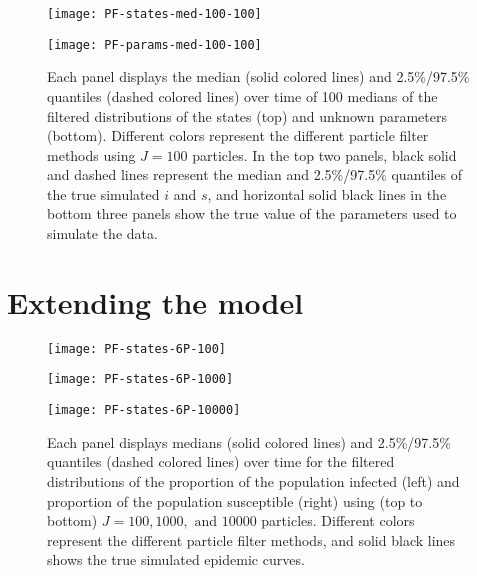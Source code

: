 \documentclass{article}
\begin{document}
\begin{figure}[ht]
\centering
\begin{minipage}{1.0\linewidth}
\texttt{[image: PF-states-med-100-100]}
\end{minipage}
\begin{minipage}{1.1\linewidth}
\texttt{[image: PF-params-med-100-100]}
\end{minipage}
\caption{Each panel displays the median (solid colored lines) and 2.5\%/97.5\% quantiles (dashed colored lines) over time of 100 medians of the filtered distributions of the states (top) and unknown parameters (bottom).  Different colors represent the different particle filter methods using $J = 100$ particles.  In the top two panels, black solid and dashed lines represent the median and 2.5\%/97.5\% quantiles of the true simulated $i$ and $s$, and horizontal solid black lines in the bottom three panels show the true value of the parameters used to simulate the data.} \label{fig:meds}
\end{figure}

\clearpage

\section{Extending the model \label{sec:extend}}

\begin{figure}[ht]
\centering
\begin{minipage}{1.0\linewidth}
\texttt{[image: PF-states-6P-100]}
\end{minipage}
\begin{minipage}{1.0\linewidth}
\texttt{[image: PF-states-6P-1000]}
\end{minipage}
\begin{minipage}{1.0\linewidth}
\texttt{[image: PF-states-6P-10000]}
\end{minipage}
\caption{Each panel displays medians (solid colored lines) and 2.5\%/97.5\% quantiles (dashed colored lines) over time for the filtered distributions of the proportion of the population infected (left) and proportion of the population susceptible (right) using (top to bottom) $J = 100, 1000, \mbox{ and } 10000$ particles.  Different colors represent the different particle filter methods, and solid black lines shows the true simulated epidemic curves.} \label{fig:states6P}
\end{figure}
\end{document}
